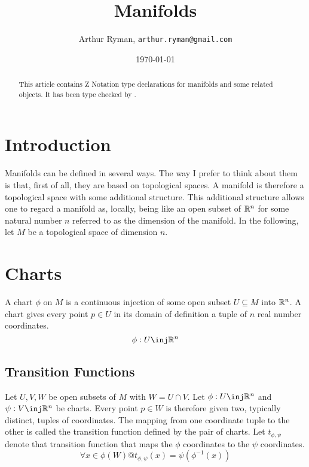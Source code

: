 \documentclass[11pt, oneside]{article}
\title{Manifolds}
\author{Arthur Ryman, {\tt arthur.ryman@gmail.com}}
\date{\today}
\begin{document}
\maketitle

\begin{abstract}
This article contains Z Notation type declarations for manifolds and some related objects.
It has been type checked by \fuzz.
\end{abstract}


    \section{Introduction}

    Manifolds can be defined in several ways.
    The way I prefer to think about them is that, first of all, they are  based on topological spaces.
    A manifold is therefore a topological space with some additional structure.
    This additional structure allows one to regard a manifold as, locally, being like an open subset of $\mathbb{R}^n$
    for some natural number $n$ referred to as the dimension of the manifold.
    In the following, let $M$ be a topological space of dimension $n$.

    \section{Charts}
    A chart $\phi$ on $M$ is a continuous injection of some open subset $U \subseteq M$ into $\mathbb{R}^n$.
    A chart gives every point $p \in U$ in its domain of definition a tuple of $n$ real number coordinates.
    \begin{equation}
        \phi: U \inj \R^n
    \end{equation}

    \subsection{Transition Functions}
    Let $U, V, W$ be open subsets of $M$ with $W = U \cap V$.
    Let $\phi: U \inj \R^n$ and $\psi: V \inj \R^n$ be charts.
    Every point $p \in W$ is therefore given two, typically distinct, tuples of coordinates.
    The mapping from one coordinate tuple to the other is called the transition function defined by the pair of charts.
    Let $t_{\phi,\psi}$ denote that transition function that maps the $\phi$ coordinates to the $\psi$ coordinates.
    \begin{equation}
        \forall x \in \phi(W) @ t_{\phi,\psi}(x) = \psi(\phi^{-1}(x))
    \end{equation}
\end{document}
